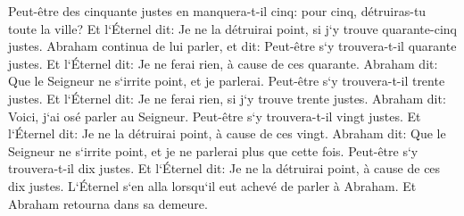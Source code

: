 \verse Peut-être des cinquante justes en manquera-t-il cinq: pour cinq, détruiras-tu toute la ville? Et l`Éternel dit: Je ne la détruirai point, si j`y trouve quarante-cinq justes. 
\verse Abraham continua de lui parler, et dit: Peut-être s`y trouvera-t-il quarante justes. Et l`Éternel dit: Je ne ferai rien, à cause de ces quarante. 
\verse Abraham dit: Que le Seigneur ne s`irrite point, et je parlerai. Peut-être s`y trouvera-t-il trente justes. Et l`Éternel dit: Je ne ferai rien, si j`y trouve trente justes. 
\verse Abraham dit: Voici, j`ai osé parler au Seigneur. Peut-être s`y trouvera-t-il vingt justes. Et l`Éternel dit: Je ne la détruirai point, à cause de ces vingt. 
\verse Abraham dit: Que le Seigneur ne s`irrite point, et je ne parlerai plus que cette fois. Peut-être s`y trouvera-t-il dix justes. Et l`Éternel dit: Je ne la détruirai point, à cause de ces dix justes. 
\verse L`Éternel s`en alla lorsqu`il eut achevé de parler à Abraham. Et Abraham retourna dans sa demeure. 

